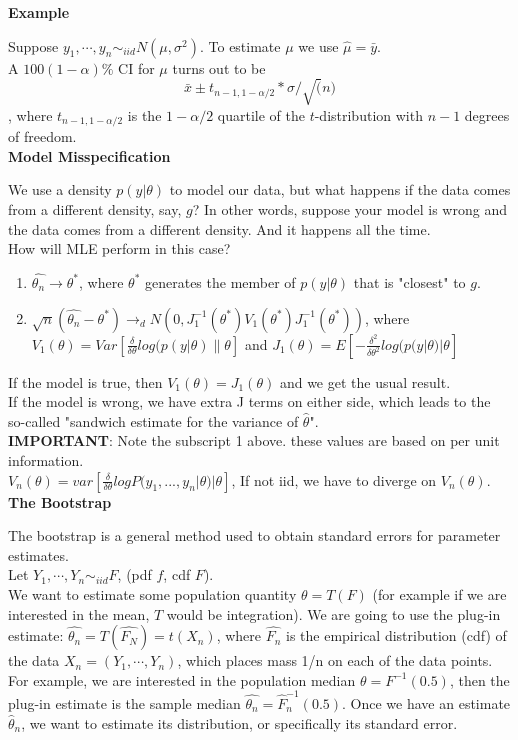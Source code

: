 \documentclass[12pt]{article}
\begin{document}
\textbf{Example}

Suppose $y_1,\cdots,y_n \sim_{iid} N(\mu, \sigma^2)$.
To estimate $\mu$ we use $\hat{\mu}=\bar{y}.$\\
A $100(1-\alpha)\%$ CI for $\mu$ turns out to be \\
$$\bar{x} \pm t_{n-1,1-\alpha/2}*\sigma/\sqrt(n)$$, where $t_{n-1,1-\alpha/2}$ is the $1-\alpha/2$ quartile of the $t$-distribution with $n-1$ degrees of freedom.\\

\textbf{Model Misspecification}

We use a density $p(y|\theta)$ to model our data, but what happens if the data comes from a different density, say, $g$? In other words, suppose your model is wrong and the data comes from a different density. And it happens all the time.\\
How will MLE perform in this case?\\
\begin{enumerate}
\item
$\hat{\theta_n} \rightarrow \theta^*$, where $\theta^*$ generates the member of $p(y|\theta)$ that is "closest" to $g$.\\
\item
$\sqrt{n}(\hat{\theta_n}-\theta^*)\rightarrow_d N(0, J_1^{-1}(\theta^*)V_1(\theta^*)J_1^{-1}(\theta^*))$, where  $V_1(\theta)=Var[\frac{\delta}{\delta \theta}log(p(y|\theta)\|\theta]$ and $J_1(\theta)=E[-\frac{\delta^2}{\delta \theta^2}log(p(y|\theta)|\theta]$\\
\end{enumerate}
If the model is true, then $V_1(\theta)=J_1(\theta)$ and we get the usual result.\\
 If the model is wrong, we have extra J terms on either side, which leads to the so-called "sandwich estimate for the variance of $\hat{\theta}$".\\
\textbf{IMPORTANT}: Note the subscript 1 above. these values are based on per unit information.\\
$V_n(\theta)=var [\frac{\delta}{\delta \theta} log P(y_1,...,y_n|\theta)|\theta]$, If not iid, we have to diverge on $V_n(\theta)$.\\


\textbf{The Bootstrap}

The bootstrap is a general method used to obtain standard errors for parameter estimates. \\
Let $Y_1,\cdots, Y_n \sim_{iid} F$, (pdf $f$, cdf $F$). \\
We want to estimate some population quantity $\theta=T(F)$ (for example if we are interested in the mean, $T$ would be integration). We are going to use the plug-in estimate: $\hat{\theta_n}=T(\hat{F_N})=t(X_n)$, where $\hat{F_n}$ is the empirical distribution (cdf) of the data $X_n=(Y_1,\cdots,Y_n)$, which places mass 1/n on each of the data points.\\
 For example, we are interested in the population median $\theta=F^{-1}(0.5)$, then the plug-in estimate is the sample median $\hat{\theta_n}=\hat{F}_n^{-1}(0.5)$. Once we have an estimate $\hat{\theta}_n$, we want to estimate its distribution, or specifically its standard error.
\end{document}
